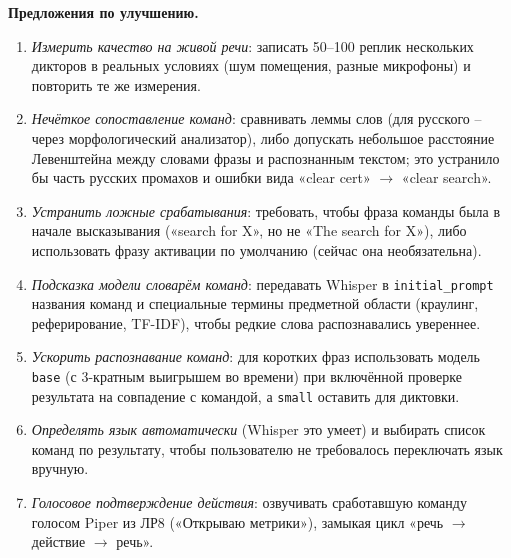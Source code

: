 \textbf{Предложения по улучшению.}
\begin{enumerate}
  \item \emph{Измерить качество на живой речи}: записать 50--100 реплик
  нескольких дикторов в реальных условиях (шум помещения, разные
  микрофоны) и повторить те же измерения.
  \item \emph{Нечёткое сопоставление команд}: сравнивать леммы слов
  (для русского -- через морфологический анализатор), либо допускать
  небольшое расстояние Левенштейна между словами фразы и распознанным
  текстом; это устранило бы часть русских промахов и ошибки вида
  «clear cert» $\to$ «clear search».
  \item \emph{Устранить ложные срабатывания}: требовать, чтобы фраза
  команды была в начале высказывания («search for X», но не
  «The search for X»), либо использовать фразу активации по
  умолчанию (сейчас она необязательна).
  \item \emph{Подсказка модели словарём команд}: передавать Whisper
  в \texttt{initial\_prompt} названия команд и специальные термины
  предметной области (краулинг, реферирование, TF-IDF), чтобы редкие слова
  распознавались увереннее.
  \item \emph{Ускорить распознавание команд}: для коротких фраз
  использовать модель \texttt{base} (с 3-кратным выигрышем во времени)
  при включённой проверке результата на совпадение с командой, а
  \texttt{small} оставить для диктовки.
  \item \emph{Определять язык автоматически} (Whisper это умеет) и
  выбирать список команд по результату, чтобы пользователю не
  требовалось переключать язык вручную.
  \item \emph{Голосовое подтверждение действия}: озвучивать
  сработавшую команду голосом Piper из ЛР8 («Открываю метрики»),
  замыкая цикл «речь $\to$ действие $\to$ речь».
\end{enumerate}

